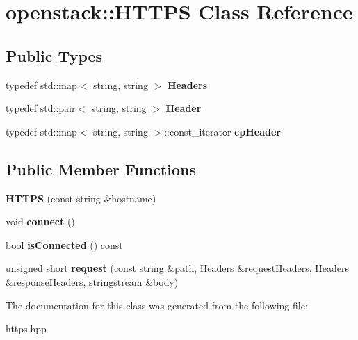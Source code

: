 \hypertarget{classopenstack_1_1HTTPS}{
\section{openstack::HTTPS Class Reference}
\label{classopenstack_1_1HTTPS}
}
\subsection*{Public Types}
\begin{DoxyCompactItemize}
\item 
\hypertarget{classopenstack_1_1HTTPS_a1ce92d056b148653076819be95987911}{
typedef std::map$<$ string, string $>$ {\bfseries Headers}}
\label{classopenstack_1_1HTTPS_a1ce92d056b148653076819be95987911}

\item 
\hypertarget{classopenstack_1_1HTTPS_a929312989d5596b4a94dae5c80431369}{
typedef std::pair$<$ string, string $>$ {\bfseries Header}}
\label{classopenstack_1_1HTTPS_a929312989d5596b4a94dae5c80431369}

\item 
\hypertarget{classopenstack_1_1HTTPS_a9750f0881216916684d4453b35191cf8}{
typedef std::map$<$ string, string $>$::const\_\-iterator {\bfseries cpHeader}}
\label{classopenstack_1_1HTTPS_a9750f0881216916684d4453b35191cf8}

\end{DoxyCompactItemize}
\subsection*{Public Member Functions}
\begin{DoxyCompactItemize}
\item 
\hypertarget{classopenstack_1_1HTTPS_a093bf160dafeba7b41bedd11fb95e9d4}{
{\bfseries HTTPS} (const string \&hostname)}
\label{classopenstack_1_1HTTPS_a093bf160dafeba7b41bedd11fb95e9d4}

\item 
\hypertarget{classopenstack_1_1HTTPS_ad07132f8787c5cbbf97d899febd317c6}{
void {\bfseries connect} ()}
\label{classopenstack_1_1HTTPS_ad07132f8787c5cbbf97d899febd317c6}

\item 
\hypertarget{classopenstack_1_1HTTPS_ac205561c22d71e7eaaf82b348f57c466}{
bool {\bfseries isConnected} () const }
\label{classopenstack_1_1HTTPS_ac205561c22d71e7eaaf82b348f57c466}

\item 
\hypertarget{classopenstack_1_1HTTPS_a3515784108580df40dade95c0d06dd1e}{
unsigned short {\bfseries request} (const string \&path, Headers \&requestHeaders, Headers \&responseHeaders, stringstream \&body)}
\label{classopenstack_1_1HTTPS_a3515784108580df40dade95c0d06dd1e}

\end{DoxyCompactItemize}


The documentation for this class was generated from the following file:\begin{DoxyCompactItemize}
\item 
https.hpp\end{DoxyCompactItemize}

